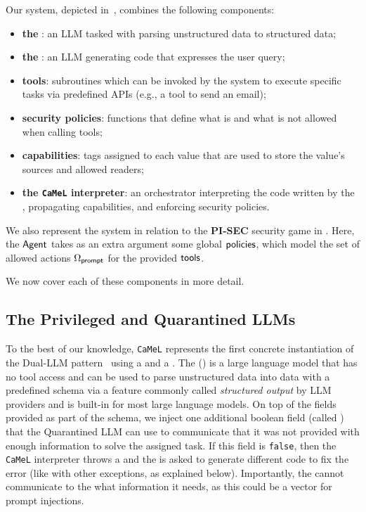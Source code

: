 \documentclass[11pt, a4paper, logo, copyright]{googledeepmind}
\newcommand{\sysname}{\texttt{CaMeL}\xspace}
\begin{document}
Our system, depicted in~, combines the following components:
\begin{itemize}
	\item \textbf{the \isolated}: an LLM tasked with parsing unstructured data to structured data;
	\item \textbf{the \rewriter}: an LLM generating code that expresses the user query;
	\item \textbf{tools}: subroutines which can be invoked by the system to execute specific tasks via predefined APIs (e.g., a tool to send an email);
	\item \textbf{security policies}: functions that define what is and what is not allowed when calling tools;
	\item \textbf{capabilities}: tags assigned to each value that are used to store the value's sources and allowed readers;
	\item \textbf{the \sysname{} interpreter}: an orchestrator interpreting the code written by the \rewriter, propagating capabilities, and enforcing security policies.
\end{itemize}

We also represent the system in relation to the \textbf{PI-SEC} security game in . Here, the $\mathsf{Agent}$ takes as an extra argument some global $\mathsf{policies}$, which model the set of allowed actions $\Omega_{\mathsf{prompt}}$ for the provided $\mathsf{tools}$.

We now cover each of these components in more detail.

\subsection{The Privileged and Quarantined LLMs}\label{sec:design-llms}

To the best of our knowledge, \sysname{} represents the first concrete instantiation of the Dual-LLM pattern~\citep{willison2023dualllm} using a \rewriter and a \isolated. The \isolated (\qllm) is a large language model that has no tool access and can be used to parse unstructured data into data with a predefined schema via a feature commonly called \textit{structured output} by LLM providers and is built-in for most large language models. On top of the fields provided as part of the schema, we inject one additional boolean field (called ) that the Quarantined LLM can use to communicate that it was not provided with enough information to solve the assigned task. If this field is \texttt{false}, then the \sysname interpreter throws a  and the \pllm is asked to generate different code to fix the error (like with other exceptions, as explained below). Importantly, the \qllm cannot communicate to the \pllm what information it needs, as this could be a vector for prompt injections.
\end{document}
